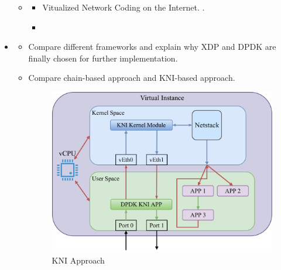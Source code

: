 \begin{itemize}[ $\leftarrow$ we keep the sketch of the storyline currently here only to have a overall view for the draft. This part will be deleted later on]
\begin{itemize}[Related Work]
\item \begin{itemize}[Virtualed Network Functions Approaches]
    \item Vitualized Network Coding on the Internet. .
    \item {}
\end{itemize}

\end{itemize}

\item \begin{itemize}[Low latency VNF]
    \item Compare different frameworks and explain why XDP and DPDK are finally chosen for further implementation.
    \item Compare chain-based approach and KNI-based approach. 

        \begin{figure}[htpb]
            \centering
            \includegraphics[width=0.8\linewidth]{./figures/KNI_Approach.pdf}
            \caption{KNI Approach}
            \label{fig:kni_approach}
        \end{figure}


\end{itemize}
\end{itemize}
